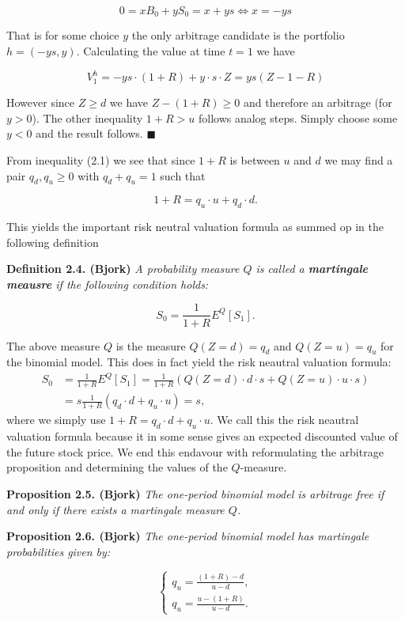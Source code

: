 \documentclass[a4paper,12pt,openany]{book}
\begin{document}
\[
0=xB_0+yS_0=x+ys\iff x=-ys
\]

That is for some choice \(y\) the only arbitrage candidate is the portfolio \(h=(-ys,y)\). Calculating the value at time \(t=1\) we have

\[
V_1^h=-ys\cdot(1+R)+y\cdot s\cdot Z=ys(Z-1-R)
\]

However since \(Z\ge d\) we have \(Z-(1+R)\ge 0\) and therefore an arbitrage (for \(y>0\)). The other inequality \(1+R>u\) follows analog steps. Simply choose some \(y<0\) and the result follows. \(\blacksquare\)

From inequality (2.1) we see that since \(1+R\) is between \(u\) and \(d\) we may find a pair \(q_d,q_u\ge 0\) with \(q_d+q_u=1\) such that

\[
1+R=q_u\cdot u+q_d\cdot d.
\]

This yields the important risk neutral valuation formula as summed op in the following definition

\textbf{Definition 2.4. (Bjork)} \emph{A probability measure \(Q\) is called a \textbf{martingale meausre} if the following condition holds:}

\[
S_0=\frac{1}{1+R}E^Q[S_1].
\]

The above measure \(Q\) is the measure \(Q(Z=d)=q_d\) and \(Q(Z=u)=q_u\) for the binomial model. This does in fact yield the risk neautral valuation formula:
\begin{align*}
S_0&=\frac{1}{1+R}E^Q[S_1]=\frac{1}{1+R}(Q(Z=d)\cdot d\cdot s+Q(Z=u)\cdot u\cdot s)\\
&=s\frac{1}{1+R}(q_d\cdot d+q_u\cdot u)=s,
\end{align*}
where we simply use \(1+R=q_d\cdot d+q_u\cdot u\). We call this the risk neautral valuation formula because it in some sense gives an expected discounted value of the future stock price. We end this endavour with reformulating the arbitrage proposition and determining the values of the \(Q\)-measure.

\textbf{Proposition 2.5. (Bjork)} \emph{The one-period binomial model is arbitrage free if and only if there exists a martingale measure \(Q\).}

\textbf{Proposition 2.6. (Bjork)} \emph{The one-period binomial model has martingale probabilities given by:}

\[
\left\{\begin{matrix}q_u=\frac{(1+R)-d}{u-d},\\ q_u=\frac{u-(1+R)}{u-d}.\end{matrix}\right.
\]
\end{document}
